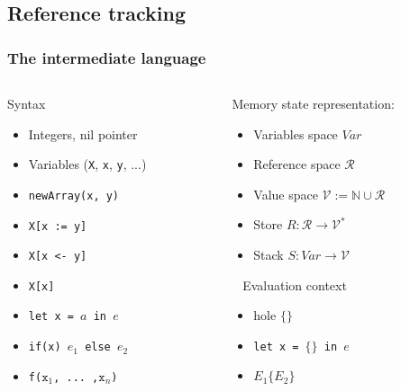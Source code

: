 \documentclass{beamer}
\newcommand{\cl}[1]{\texttt{#1}}
\newcommand{\N}{\mathbb{N}}
\begin{document}
\subsection{Reference tracking}

\begin{frame}
\frametitle{The intermediate language}
\begin{columns}
\begin{column}{0.45\textwidth}
Syntax
\begin{itemize}
\item Integers, nil pointer
\item Variables (\cl{X}, \cl{x}, \cl{y}, ...)
\item \cl{newArray(x, y)}
\item \cl{X[x := y]}
\item \cl{X[x <- y]}
\item \cl{X[x]}
\item \cl{let x = $a$ in $e$}
\item \cl{if(x) $e_1$ else $e_2$}
\item \cl{f($\cl{x}_1$, ... ,$\cl{x}_n$)}
\end{itemize}
\end{column}

\begin{column}{0.55\textwidth}
Memory state representation:
\begin{itemize}
\item Variables space $Var$
\item Reference space $\mathcal{R}$
\item Value space $\mathcal{V} := \N \cup \mathcal{R}$
\item Store $R : \mathcal{R} \longrightarrow \mathcal{V}^*$
\item Stack $S : Var \longrightarrow \mathcal{V}$
\end{itemize}
\ \newline
Evaluation context
\begin{itemize}
\item hole $\{\}$
\item \cl{let x = $\{\}$ in $e$}
\item $E_1\{E_2\}$
\end{itemize}
\end{column}
\end{columns}

\end{frame}
\end{document}
